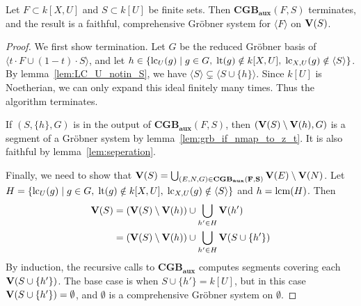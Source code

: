 \begin{algorithm}
  \caption{$\mathbf{CGB_{aux}}$}
\end{algorithm}
\begin{theorem}\label{thm:CGB_aux}
  Let $F \subset k[X, U]$ and $S \subset k[U]$ be finite sets. %
  Then $\mathbf{CGB_{aux}}(F, S)$ terminates, and the result is a faithful, comprehensive Gröbner system for $\langle F \rangle$ on $\operatorname{\mathbf V}(S)$.
\end{theorem}
\begin{proof}
  We first show termination. Let $G$ be the reduced Gröbner basis of $\langle t\cdot F \cup (1-t)\cdot S\rangle$, and let $h \in \{\operatorname{lc}_{U}(g) \mid g \in G,\; \operatorname{lt}(g) \notin k[X, U],\; \operatorname{lc}_{X, U}(g) \notin \langle S \rangle\}$. By lemma~\ref{lem:LC_U_notin_S}, we have $\langle S \rangle \subsetneq \langle S \cup \{h\} \rangle$. Since $k[U]$ is Noetherian, we can only expand this ideal finitely many times. Thus the algorithm terminates.


  If $(S, \{h\}, G)$ is in the output of $\mathbf{CGB_{aux}}(F, S)$, then $(\operatorname{\mathbf V}(S) \setminus \operatorname{\mathbf V}(h), G)$ is a segment of a Gröbner system by lemma~\ref{lem:grb_if_nmap_to_z_t}. It is also faithful by lemma~\ref{lem:seperation}.

  Finally, we need to show that $\operatorname{\mathbf V}(S) = \bigcup_{(E, N, G) \in \mathbf{CGB_{aux}(F, S)}} \operatorname{\mathbf V}(E) \setminus \operatorname{\mathbf V}(N)$. Let $H = \{\operatorname{lc}_{U}(g) \mid g \in G,\; \operatorname{lt}(g) \notin k[X, U],\; \operatorname{lc}_{X, U}(g) \notin \langle S \rangle \}$ and $h = \operatorname{lcm}(H)$. Then
  \begin{align*}
    \operatorname{\mathbf V}(S) &= (\operatorname{\mathbf V}(S) \setminus \operatorname{\mathbf V}(h)) \cup \bigcup_{h' \in H} \operatorname{\mathbf V}(h') \\
    &= (\operatorname{\mathbf V}(S) \setminus \operatorname{\mathbf V}(h)) \cup \bigcup_{h' \in H} \operatorname{\mathbf V}(S \cup \{h'\})
  \end{align*}
  By induction, the recursive calls to $\mathbf{CGB_{aux}}$ computes segments covering each $\operatorname{\mathbf V}(S \cup \{h'\})$. The base case is when $S \cup \{h'\} = k[U]$, but in this case $\operatorname{\mathbf V}(S \cup \{h'\}) = \emptyset$, and $\emptyset$ is a comprehensive Gröbner system on $\emptyset$.
\end{proof}

